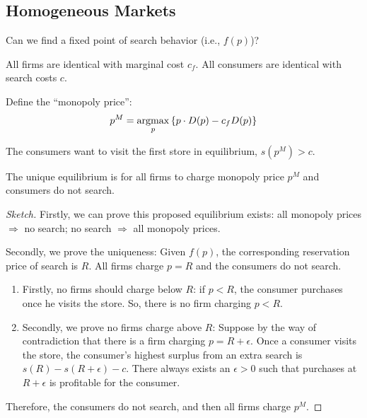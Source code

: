 \documentclass[11pt]{elegantbook}
\newcommand{\argmax}{\operatornamewithlimits{argmax}}
\begin{document}
\subsection{Homogeneous Markets}
Can we find a fixed point of search behavior (i.e., $f(p)$)?

\begin{assumption}
    All firms are identical with marginal cost $c_f$. All consumers are identical with search costs $c$.
\end{assumption}
Define the ``monopoly price'':
\begin{equation}
    \begin{aligned}
        p^M=\argmax_{p}\left\{p\cdot D(p)-c_fD(p)\right\}
    \end{aligned}
    \nonumber
\end{equation}
\begin{assumption}
    The consumers want to visit the first store in equilibrium, $s(p^M)>c$.
\end{assumption}

\begin{theorem}
    The unique equilibrium is for all firms to charge monopoly price $p^M$ and consumers do not search.
\end{theorem}
\begin{proof}[Sketch]
    Firstly, we can prove this proposed equilibrium exists: all monopoly prices $\Rightarrow$ no search; no search $\Rightarrow$ all monopoly prices.

    Secondly, we prove the uniqueness: Given $f(p)$, the corresponding reservation price of search is $R$. All firms charge $p=R$ and the consumers do not search.
    \begin{enumerate}
        \item Firstly, no firms should charge below $R$: if $p<R$, the consumer purchases once he visits the store. So, there is no firm charging $p<R$.
        \item Secondly, we prove no firms charge above $R$: Suppose by the way of contradiction that there is a firm charging $p=R+\epsilon$. Once a consumer visits the store, the consumer's highest surplus from an extra search is $s(R)-s(R+\epsilon)-c$. There always exists an $\epsilon>0$ such that purchases at $R+\epsilon$ is profitable for the consumer.
    \end{enumerate}
    Therefore, the consumers do not search, and then all firms charge $p^M$.
\end{proof}
\end{document}
